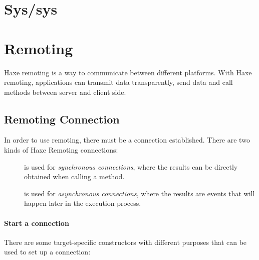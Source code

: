 \section{Sys/sys}
\label{std-sys}

\section{Remoting}
\label{std-remoting}

Haxe remoting is a way to communicate between different platforms. With Haxe remoting, applications can transmit data transparently, send data and call methods between server and client side.

\subsection{Remoting Connection}
\label{std-remoting-connection}

In order to use remoting, there must be a connection established. There are two kinds of Haxe Remoting connections: 
\begin{description}
	\item[] is used for \emph{synchronous connections}, where the results can be directly obtained when calling a method. 
	\item[] is used for \emph{asynchronous connections}, where the results are events that will happen later in the execution process.
\end{description}

\paragraph{Start a connection}
There are some target-specific constructors with different purposes that can be used to set up a connection:

